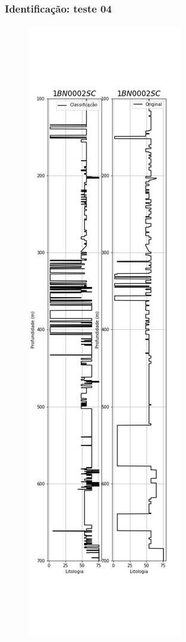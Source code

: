 \documentclass[aspectratio=10]{beamer} %
\begin{document}
\begin{frame}
	\frametitle{Identificação: teste 04}
	\begin{figure}[H]
		\centering
		\includegraphics[scale=0.18]{Imagens/result04.png}
		\label{IDt04}
	\end{figure} 
\end{frame}
\end{document}
